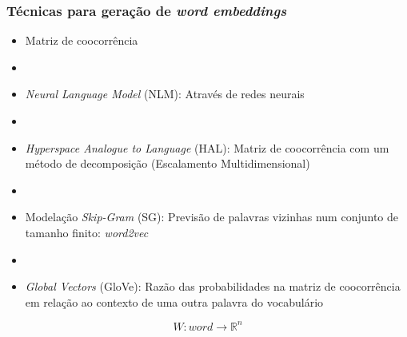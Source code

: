 \documentclass[10pt]{beamer}
\begin{document}
\begin{frame}[fragile]
  \frametitle{Técnicas para geração de \textit{word embeddings}}
  
   \begin{itemize}
    \item Matriz de coocorrência

    \item[\ ] \ 

    \item \textit{Neural Language Model} (NLM): Através de redes neurais

    \item[\ ] \ 

    \item \textit{Hyperspace Analogue to Language} (HAL): Matriz de coocorrência com um método de decomposição (Escalamento Multidimensional)

    \item[\ ] \ 

    \item Modelação \textit{Skip-Gram} (SG): Previsão de palavras vizinhas num conjunto de tamanho finito: \textit{word2vec}

    \item[\ ] \ 

    \item \textit{Global Vectors} (GloVe): Razão das probabilidades na matriz de coocorrência em relação ao contexto de uma outra palavra do vocabulário

  \end{itemize}

  \begin{equation}
  W:word \to \mathbb{R}^n \nonumber
  \end{equation}

\end{frame}
\end{document}
